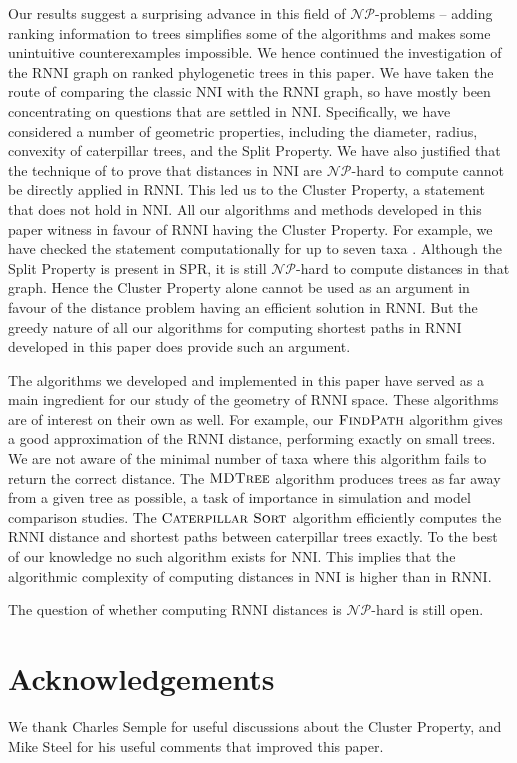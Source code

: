 \documentclass{amsart}
\newcommand{\np}{\mathcal{NP}}
\newcommand{\nni}{\mathrm{NNI}}
\newcommand{\rnni}{\mathrm{RNNI}}
\newcommand{\spr}{\mathrm{SPR}}
\newcommand{\csort}{\textsc{Caterpillar Sort}}
\newcommand{\findpath}{\textsc{FindPath}}
\newcommand{\mdtree}{\textsc{MDTree}}
\begin{document}
Our results suggest a surprising advance in this field of $\np$-problems -- adding ranking information to trees simplifies some of the algorithms and makes some unintuitive counterexamples impossible.
We hence continued the investigation of the $\rnni$ graph on ranked phylogenetic trees in this paper.
We have taken the route of comparing the classic $\nni$ with the $\rnni$ graph, so have mostly been concentrating on questions that are settled in $\nni$.
Specifically, we have considered a number of geometric properties, including the diameter, radius, convexity of caterpillar trees, and the Split Property.
We have also justified that the technique of \textcite{Dasgupta2000-xa} to prove that distances in $\nni$ are $\np$-hard to compute cannot be directly applied in $\rnni$.
This led us to the Cluster Property, a statement that does not hold in $\nni$.
All our algorithms and methods developed in this paper witness in favour of $\rnni$ having the Cluster Property.
For example, we have checked the statement computationally for up to seven taxa \autocite{Collienne2019}.
Although the Split Property is present in $\spr$, it is still $\np$-hard to compute distances in that graph.
Hence the Cluster Property alone cannot be used as an argument in favour of the distance problem having an efficient solution in $\rnni$.
But the greedy nature of all our algorithms for computing shortest paths in $\rnni$ developed in this paper does provide such an argument.

The algorithms we developed and implemented in this paper have served as a main ingredient for our study of the geometry of $\rnni$ space.
These algorithms are of interest on their own as well.
For example, our $\findpath$ algorithm gives a good approximation of the $\rnni$ distance, performing exactly on small trees.
We are not aware of the minimal number of taxa where this algorithm fails to return the correct distance.
The $\mdtree$ algorithm produces trees as far away from a given tree as possible, a task of importance in simulation and model comparison studies.
The $\csort$ algorithm efficiently computes the $\rnni$ distance and shortest paths between caterpillar trees exactly.
To the best of our knowledge no such algorithm exists for $\nni$.
This implies that the algorithmic complexity of computing distances in $\nni$ is higher than in $\rnni$.

The question of whether computing $\rnni$ distances is $\np$-hard is still open.


\section*{Acknowledgements}
We thank Charles Semple for useful discussions about the Cluster Property, and Mike Steel for his useful comments that improved this paper.
\end{document}
